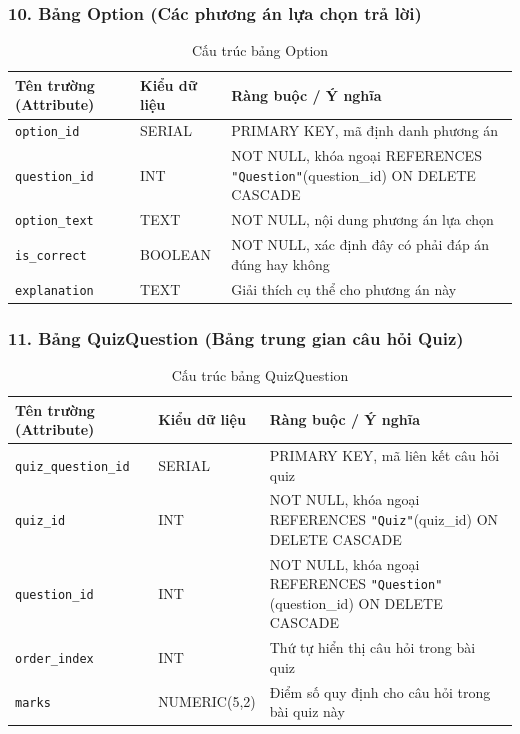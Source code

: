 \documentclass[../DoAn.tex]{subfiles}
\begin{document}
\subsubsection*{10. Bảng Option (Các phương án lựa chọn trả lời)}
\begin{table}[H]
\centering
\footnotesize
\renewcommand{\arraystretch}{1.2}
\begin{tabular}{|p{4.2cm}|p{3.2cm}|p{7.1cm}|}
\hline
\textbf{Tên trường (Attribute)} & \textbf{Kiểu dữ liệu} & \textbf{Ràng buộc / Ý nghĩa} \\
\hline
\texttt{option\_id} & SERIAL & PRIMARY KEY, mã định danh phương án \\
\hline
\texttt{question\_id} & INT & NOT NULL, khóa ngoại REFERENCES \texttt{"Question"}(question\_id) ON DELETE CASCADE \\
\hline
\texttt{option\_text} & TEXT & NOT NULL, nội dung phương án lựa chọn \\
\hline
\texttt{is\_correct} & BOOLEAN & NOT NULL, xác định đây có phải đáp án đúng hay không \\
\hline
\texttt{explanation} & TEXT & Giải thích cụ thể cho phương án này \\
\hline
\end{tabular}
\caption{Cấu trúc bảng Option}
\label{tab:schema_option}
\end{table}

\subsubsection*{11. Bảng QuizQuestion (Bảng trung gian câu hỏi Quiz)}
\begin{table}[H]
\centering
\footnotesize
\renewcommand{\arraystretch}{1.2}
\begin{tabular}{|p{4.2cm}|p{3.2cm}|p{7.1cm}|}
\hline
\textbf{Tên trường (Attribute)} & \textbf{Kiểu dữ liệu} & \textbf{Ràng buộc / Ý nghĩa} \\
\hline
\texttt{quiz\_question\_id} & SERIAL & PRIMARY KEY, mã liên kết câu hỏi quiz \\
\hline
\texttt{quiz\_id} & INT & NOT NULL, khóa ngoại REFERENCES \texttt{"Quiz"}(quiz\_id) ON DELETE CASCADE \\
\hline
\texttt{question\_id} & INT & NOT NULL, khóa ngoại REFERENCES \texttt{"Question"}(question\_id) ON DELETE CASCADE \\
\hline
\texttt{order\_index} & INT & Thứ tự hiển thị câu hỏi trong bài quiz \\
\hline
\texttt{marks} & NUMERIC(5,2) & Điểm số quy định cho câu hỏi trong bài quiz này \\
\hline
\end{tabular}
\caption{Cấu trúc bảng QuizQuestion}
\label{tab:schema_quizquestion}
\end{table}
\end{document}

